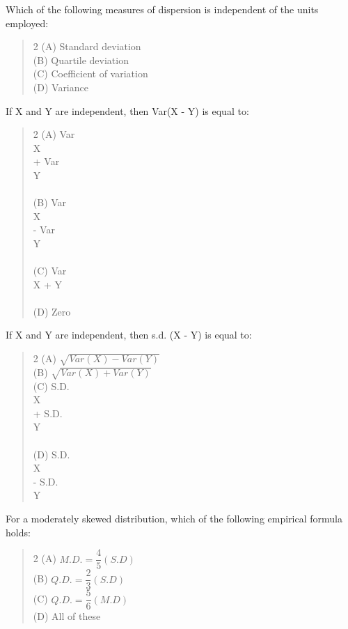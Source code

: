 \documentclass[11pt,a4paper]{article}
\begin{document}
\begin{mcqlist}
\item Which of the following measures of dispersion is independent of the units employed:
\begin{quote}\begin{multicols}{2}
\noindent (A) Standard deviation \\
(B) Quartile deviation \\
(C) Coefficient of variation \\
(D) Variance
\end{multicols}\end{quote}

\item If X and Y are independent, then Var(X - Y) is equal to:
\begin{quote}\begin{multicols}{2}
\noindent (A) Var\\{X\\} + Var\\{Y\\} \\
(B) Var\\{X\\} - Var\\{Y\\} \\
(C) Var\\{X + Y\\} \\
(D) Zero
\end{multicols}\end{quote}

\item If X and Y are independent, then s.d. (X - Y) is equal to:
\begin{quote}\begin{multicols}{2}
\noindent (A) $\sqrt{Var(X) - Var(Y)}$ \\
(B) $\sqrt{Var(X) + Var(Y)}$ \\
(C) S.D.\\{X\\} + S.D.\\{Y\\} \\
(D) S.D.\\{X\\} - S.D.\\{Y\\}
\end{multicols}\end{quote}

\item For a moderately skewed distribution, which of the following empirical formula holds:
\begin{quote}\begin{multicols}{2}
\noindent (A) $M.D. = \dfrac{4}{5}(S.D)$ \\
(B) $Q.D. = \dfrac{2}{3}(S.D)$ \\
(C) $Q.D. = \dfrac{5}{6}(M.D)$ \\
(D) All of these
\end{multicols}\end{quote}


\end{mcqlist}
\end{document}
